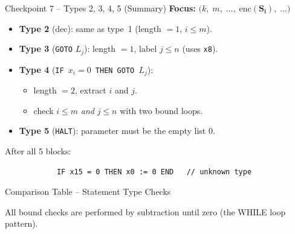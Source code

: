 \documentclass[aspectratio=169]{beamer}
\begin{document}
	\begin{frame}[fragile]{Checkpoint 7 – Types 2, 3, 4, 5 (Summary)}
		\textbf{Focus:} \(\bigl(k,\; m,\; \ldots,\; \mathbf{\mathrm{enc}(S_i)},\; \ldots\bigr)\)
		{\fontsize{8}{9}\selectfont
			\begin{itemize}
				\item \textbf{Type 2} (dec): same as type~1 (length $=1$, $i\le m$).
				\item \textbf{Type 3} (\texttt{GOTO} $L_j$): length $=1$, label $j\le n$ (uses \texttt{x8}).
				\item \textbf{Type 4} (\texttt{IF $x_i{=}0$ THEN GOTO $L_j$}):
				\begin{itemize}
					\item length $=2$, extract $i$ and $j$.
					\item check $i\le m$ \emph{and} $j\le n$ with two bound loops.
				\end{itemize}
				\item \textbf{Type 5} (\texttt{HALT}): parameter must be the empty list $0$.
			\end{itemize}
		}
		\vspace{4pt}
		After all 5 blocks:
		\begin{verbatim}
			IF x15 = 0 THEN x0 := 0 END   // unknown type
		\end{verbatim}
	\end{frame}
	
	\begin{frame}{Comparison Table – Statement Type Checks}
		\centering
		
		\vspace{6pt}
		\small
		All bound checks are performed by subtraction until zero (the WHILE loop pattern).
	\end{frame}
	
\end{document}
